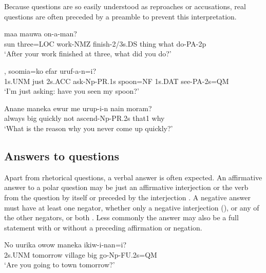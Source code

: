 Because questions are so easily understood as reproaches or accusations, real questions are often preceded by a preamble to prevent this interpretation.

\ea%
\label{ex:x1210}
\gll [Ama  arow=pa  mauw-owa  weeser-eya]  maa  mauwa  on-a-man? \\
 sun  three=LOC  work-NMZ  finish-2/3s.DS  thing  what  do-PA-2p     \\
\glt `After your work finished at three, what did you do?'
\z





\ea%
\label{ex:x1211}
,  soomia=ko  efar uruf-a-n=i? \\
1s.UNM  just  2s.ACC  ask-Np-PR.1s  spoon=NF  1s.DAT  see-PA-2s=QM    \\
\glt `I'm just asking: have you seen my spoon?'
\z









\ea%
\label{ex:x1355}
\gll Anane  maneka  ewur  me  urup-i-n  nain  moram? \\
 always  big  quickly  not  ascend-Np-PR.2s  that1  why     \\
\glt `What is the reason why you never come up quickly?'
\z





\subsection{Answers to questions}
\hypertarget{RefHeading22861935131865}{}
Apart from rhetorical questions, a verbal answer is often expected. An affirmative answer to a polar question  may be just an affirmative interjection  or the verb from the question by itself or preceded by the interjection . A negative answer must have at least one negator, whether only a negative interjection (), or any of the other negators, or both . Less commonly the answer may also be a full statement with or without a preceding affirmation   or negation.

\ea%
\label{ex:x1216}
\gll No  uurika  owow  maneka  ikiw-i-nan=i? \\
2s.UNM  tomorrow  village  big  go-Np-FU.2s=QM      \\
\glt `Are you going to town tomorrow?'
\z




